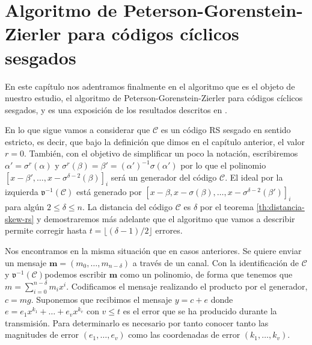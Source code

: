 \chapter[Algoritmo PGZ para códigos cíclicos sesgados]{Algoritmo de Peterson-Gorenstein-Zierler para códigos cíclicos sesgados}

En este capítulo nos adentramos finalmente en el algoritmo que es el objeto de nuestro estudio, el algoritmo de Peterson-Gorenstein-Zierler para códigos cíclicos sesgados, y es una exposición de los resultados descritos en \parencite{gomez-torrecillas_petersongorensteinzierler_2018}.

En lo que sigue vamos a considerar que \(\mathcal C\) es un código RS sesgado en sentido estricto, es decir, que bajo la definición que dimos en el capítulo anterior, el valor \(r = 0\).
También, con el objetivo de simplificar un poco la notación, escribiremos \(\alpha' = \sigma^r(\alpha)\) y \(\sigma^r(\beta) = \beta' = (\alpha')^{-1}\sigma(\alpha')\) por lo que el polinomio \([x - \beta', \dots, x - \sigma^{\delta - 2}(\beta)]_i\) será un generador del código \(\mathcal C\).
El ideal por la izquierda \(\mathfrak v^{-1}(\mathcal C)\) está generado por \([x - \beta, x - \sigma(\beta), \dots, x - \sigma^{\delta - 2}(\beta')]_i\) para algún \(2 \leq \delta \leq n\).
La distancia del código \(\mathcal C\) es \(\delta\) por el teorema \ref{th:distancia-skew-rs} y demostraremos más adelante que el algoritmo que vamos a describir permite corregir hasta \(t = \lfloor (\delta - 1)/2 \rfloor\) errores.

Nos encontramos en la misma situación que en casos anteriores.
Se quiere enviar un mensaje \(\mathbf{m} = (m_0, \dots, m_{n - \delta})\) a través de un canal.
Con la identificación de \(\mathcal C\) y \(\mathfrak v^{-1}(\mathcal C)\)podemos escribir \(\mathbf{m}\) como un polinomio, de forma que tenemos que \(m = \sum_{i=0}^{n-\delta}m_ix^{i}\).
Codificamos el mensaje realizando el producto por el generador, \(c = mg\).
Suponemos que recibimos el mensaje \(y = c + e\) donde \(e = e_1x^{k_1} + \dots + e_vx^{k_v}\) con \(v \leq t\) es el error que se ha producido durante la transmisión.
Para determinarlo es necesario por tanto conocer tanto las magnitudes de error \((e_{1}, \dots, e_{v})\) como las coordenadas de error \((k_1, \dots, k_v)\).

